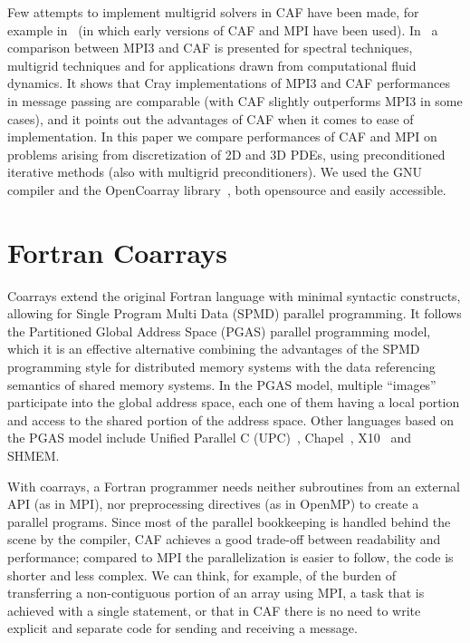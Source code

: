 \documentclass{IOS-Book-Article}
\begin{document}
Few attempts to implement multigrid solvers in CAF have been made, for
example in~\cite{Numrich:1998} (in which early versions of CAF and MPI
have been used).  In~\cite{Garain:2015} a comparison between MPI3 and
CAF is presented for spectral techniques, multigrid techniques and for
applications drawn from computational fluid dynamics. It shows that
Cray implementations of MPI3 and CAF performances in message passing
are comparable (with CAF slightly outperforms MPI3 in some cases), and
it points out the advantages of CAF when it comes to ease of
implementation. In this paper we compare performances of CAF and MPI
on problems arising from discretization of 2D and 3D PDEs, using
preconditioned iterative methods (also with multigrid
preconditioners). We used the GNU compiler and the OpenCoarray
library~\cite{PGAS14}, both opensource and easily accessible.

\section{Fortran Coarrays}

Coarrays extend the original Fortran language with minimal syntactic 
constructs, allowing for Single Program Multi Data (SPMD) parallel
programming.  
It follows the Partitioned Global Address Space (PGAS) parallel
programming model, which it is an effective alternative combining the
advantages of the SPMD programming style for distributed memory
systems with the data referencing semantics of shared memory systems.  
In the PGAS model, multiple ``images'' participate into  the global
address space, each one of them having a local portion and access to
the shared portion of the address space. 
Other  languages based on the PGAS model include Unified Parallel C
(UPC)~\cite{UPCSpec},  Chapel~\cite{chapel}, X10~\cite{Charles:2005}
and SHMEM.

With coarrays, a Fortran programmer needs neither 
subroutines from an  external API (as in MPI), nor preprocessing
directives (as in OpenMP) to create a parallel programs.  
Since most of the parallel bookkeeping is handled behind the scene by
the compiler, CAF achieves a good trade-off between readability and
performance;  compared to MPI the parallelization is easier to
follow, the code is shorter and less complex. We can think, for
example, of the burden of transferring a non-contiguous portion of an
array using MPI, a task that is achieved with a single statement, 
or  that in  CAF there is no need to write explicit and separate code
for sending and receiving a message. 
\end{document}
